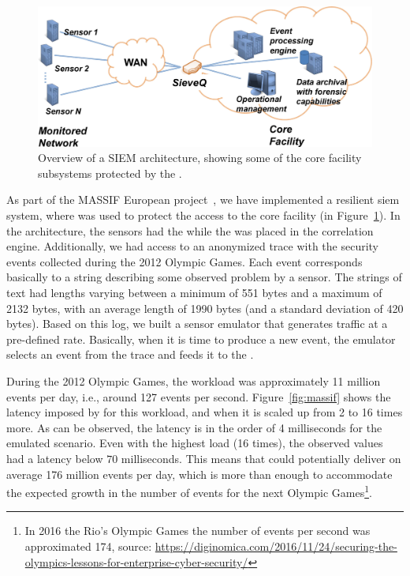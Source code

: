 \begin{figure}[t]
\centering
\includegraphics[width=0.65\columnwidth]{images/images/SIEM.pdf}
\caption{Overview of a SIEM architecture, showing some of the core facility subsystems protected by the \sieveq.}
\label{fig:siem}
\end{figure}


As part of the MASSIF European project~\cite{Vianello:2013}, we have implemented a resilient \gls{siem} system, where \sieveq was used to protect the access to the core facility (in Figure~\ref{fig:siem}).
In the \sieveq architecture, the sensors had the \sender while the \postsieve was placed in the correlation engine.
Additionally, we had access to an anonymized trace with the security events collected during the 2012 Olympic Games.
Each event corresponds basically to a string describing some observed problem by a sensor. The strings of text had lengths varying between a minimum of 551 bytes and a maximum of 2132 bytes, with an average length of 1990 bytes (and a standard deviation of 420 bytes). Based on this log, we built a sensor emulator that generates traffic at a pre-defined rate. Basically, when it is time to produce a new event, the emulator selects an event from the trace and feeds it to the \sender.

During the 2012 Olympic Games, the workload was approximately 11 million events per day, i.e., around 127 events per second.
Figure~\ref{fig:massif} shows the latency imposed by \sieveq for this workload, and when it is scaled up from 2 to 16 times more. 
As can be observed, the latency is in the order of 4 milliseconds for the emulated scenario.
Even with the highest load (16 times), the observed values had a latency below $70$ milliseconds.
This means that \sieveq could potentially deliver on average 176 million events per day, which is more than enough to accommodate the expected growth in the number of events for the next Olympic Games\footnote{In 2016 the Rio's Olympic Games the number of events per second was approximated 174, source: \url{https://diginomica.com/2016/11/24/securing-the-olympics-lessons-for-enterprise-cyber-security/}}.

